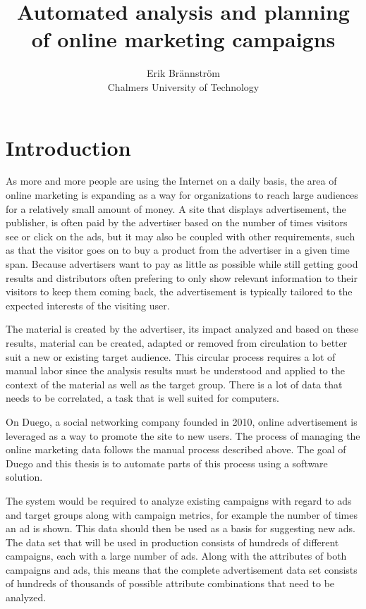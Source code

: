 \documentclass[10pt,twocolumn]{article}
\begin{document}
\title{Automated analysis and planning of online marketing campaigns}
\author{Erik Brännström\\
  Chalmers University of Technology}
\date{}
\maketitle

\section{Introduction}
As more and more people are using the Internet on a daily basis, the area of online marketing is expanding as a way for organizations to reach large audiences for a relatively small amount of money. A site that displays advertisement, the publisher, is often paid by the advertiser based on the number of times visitors see or click on the ads, but it may also be coupled with other requirements, such as that the visitor goes on to buy a product from the advertiser in a given time span. Because advertisers want to pay as little as possible while still getting good results and distributors often prefering to only show relevant information to their visitors to keep them coming back, the advertisement is typically tailored to the expected interests of the visiting user.

The material is created by the advertiser, its impact analyzed and based on these results, material can be created, adapted or removed from circulation to better suit a new or existing target audience. This circular process requires a lot of manual labor since the analysis results must be understood and applied to the context of the material as well as the target group. There is a lot of data that needs to be correlated, a task that is well suited for computers.

On Duego, a social networking company founded in 2010, online advertisement is leveraged as a way to promote the site to new users. The process of managing the online marketing data follows the manual process described above. The goal of Duego and this thesis is to automate parts of this process using a software solution.

The system would be required to analyze existing campaigns with regard to ads and target groups along with campaign metrics, for example the number of times an ad is shown. This data should then be used as a basis for suggesting new ads. The data set that will be used in production consists of hundreds of different campaigns, each with a large number of ads. Along with the attributes of both campaigns and ads, this means that the complete advertisement data set consists of hundreds of thousands of possible attribute combinations that need to be analyzed.
\end{document}
